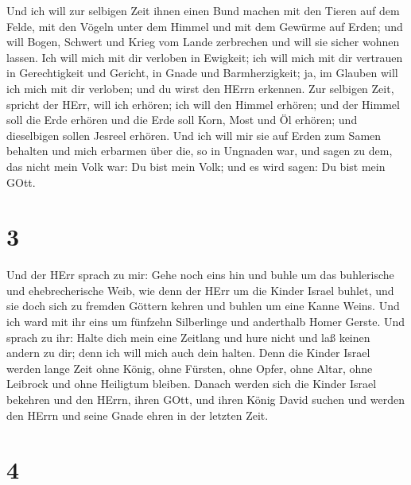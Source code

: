  Und ich will zur selbigen Zeit ihnen einen Bund machen mit
den Tieren auf dem Felde, mit den Vögeln unter dem Himmel und mit dem
Gewürme auf Erden; und will Bogen, Schwert und Krieg vom Lande
zerbrechen und will sie sicher wohnen lassen.  Ich will
mich mit dir verloben in Ewigkeit; ich will mich mit dir vertrauen in
Gerechtigkeit und Gericht, in Gnade und Barmherzigkeit; 
ja, im Glauben will ich mich mit dir verloben; und du wirst den HErrn
erkennen.  Zur selbigen Zeit, spricht der HErr, will ich
erhören; ich will den Himmel erhören; und der Himmel soll die Erde
erhören  und die Erde soll Korn, Most und Öl erhören; und
dieselbigen sollen Jesreel erhören.  Und ich will mir sie
auf Erden zum Samen behalten und mich erbarmen über die, so in Ungnaden
war, und sagen zu dem, das nicht mein Volk war: Du bist mein Volk; und
es wird sagen: Du bist mein GOtt.

\hypertarget{section-2}{%
\section{3}\label{section-2}}

 Und der HErr sprach zu mir: Gehe noch eins hin und buhle um
das buhlerische und ehebrecherische Weib, wie denn der HErr um die
Kinder Israel buhlet, und sie doch sich zu fremden Göttern kehren und
buhlen um eine Kanne Weins.  Und ich ward mit ihr eins um
fünfzehn Silberlinge und anderthalb Homer Gerste.  Und
sprach zu ihr: Halte dich mein eine Zeitlang und hure nicht und laß
keinen andern zu dir; denn ich will mich auch dein halten. 
Denn die Kinder Israel werden lange Zeit ohne König, ohne Fürsten, ohne
Opfer, ohne Altar, ohne Leibrock und ohne Heiligtum bleiben.
 Danach werden sich die Kinder Israel bekehren und den
HErrn, ihren GOtt, und ihren König David suchen und werden den HErrn und
seine Gnade ehren in der letzten Zeit.

\hypertarget{section-3}{%
\section{4}\label{section-3}}

